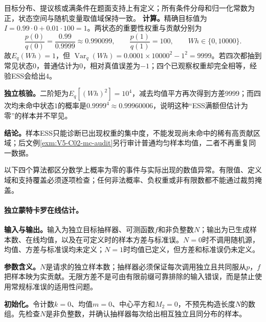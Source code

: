 \begin{solution}
\SolGiven 目标分布、提议核或满条件在题面支持上有定义；所有条件分母和归一化常数为正，状态空间与随机变量取值域保持一致。
\SolDerive
\textbf{计算。}精确目标值为$I=0.99\cdot0+0.01\cdot100=1$。两状态的重要性权重与贡献分别为
\[
\frac{p(0)}{q(0)}=\frac{0.99}{0.9999}\approx0.990099,
\qquad \frac{p(1)}{q(1)}=100,
\qquad Wh\in\{0,10000\}.
\]
故$E_q(Wh)=1$，但
$\operatorname{Var}_q(Wh)=0.0001\times10000^2-1^2=9999$。若四次都抽到常见状态$0$，普通估计为$0$，相对真值误差为$-1$；四个已观察权重却完全相等，经验ESS会给出$4$。

\textbf{独立核验。}二阶矩为$E_q[(Wh)^2]=10^4$，减去均值平方再次得到方差$9999$；而四次均未命中状态$1$的概率是$0.9999^4\approx0.99960006$，说明这种“ESS满额但估计为零”的样本并不罕见。

\textbf{结论。}样本ESS只能诊断已出现权重的集中度，不能发现尚未命中的稀有高贡献区域；后文例\ref{exm:V5-C02-mc-audit}另行审计普通均匀样本均值，二者不再重复同一数据。
\end{solution}

\nopagebreak[4]
\label{struct:V5-C02-CH19}
\nopagebreak[4]
以下四个算法都区分数学上概率为零的事件与实际出现的数值异常。有限值、定义域和支持覆盖必须逐项检查；任何非法概率、负权重或非有限数都不能通过裁剪掩盖。

\label{struct:V5-C02-CH20}
\paragraph{独立蒙特卡罗在线估计。}
\textbf{输入与输出。}输入为独立目标抽样器、可测函数$f$和非负整数$N$；输出为已生成样本数、在线均值，以及在可定义时的样本方差与标准误。$N=0$时不调用随机源，均值、方差与标准误均未定义；$N=1$时均值已定义，但方差和标准误仍未定义。

\label{struct:V5-C02-CH21}
\textbf{参数含义。}$N$是请求的独立样本数；抽样器必须保证每次调用独立且共同服从$p$，$f$把样本映为实贡献。无限方差不是可由有限前缀可靠排除的输入错误，而是禁止使用常规标准误的适用性问题。

\label{struct:V5-C02-CH22}
\textbf{初始化。}令计数$k=0$、均值$m=0$、中心平方和$M_2=0$，不预先构造长度$N$的数组。先检查$N$是非负整数，并确认抽样器每次给出相互独立且同分布的样本。

